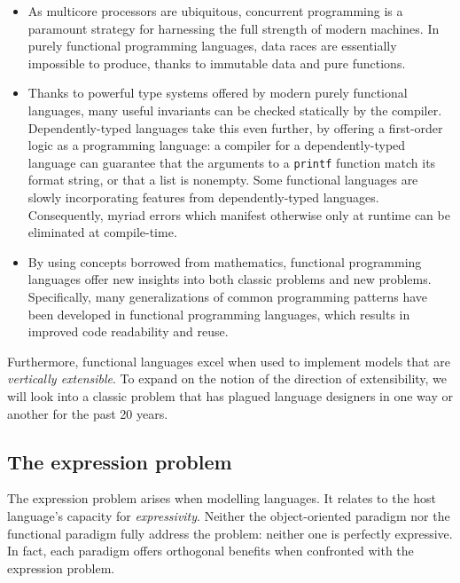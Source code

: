 \documentclass[letterpaper,11pt]{article}
\newcommand{\code}{\texttt}
\begin{document}
\begin{itemize}
    \item
        As multicore processors are ubiquitous, concurrent programming is a
        paramount strategy for harnessing the full strength of modern machines.
        In purely functional programming languages, data races are essentially
        impossible to produce, thanks to immutable data and pure functions.

    \item
        Thanks to powerful type systems offered by modern purely functional
        languages, many useful invariants can be checked statically by the
        compiler. Dependently-typed languages take this even further, by
        offering a first-order logic as a programming language: a compiler for
        a dependently-typed language can guarantee that the arguments to a
        \code{printf} function match its format string, or that a list is
        nonempty. Some functional languages are slowly incorporating features
        from dependently-typed languages. Consequently, myriad errors which
        manifest otherwise only at runtime can be eliminated at compile-time.

    \item
        By using concepts borrowed from mathematics, functional programming
        languages offer new insights into both classic problems and new
        problems.  Specifically, many generalizations of common programming
        patterns have been developed in functional programming languages, which
        results in improved code readability and reuse.
\end{itemize}

Furthermore, functional languages excel when used to implement models that are
\emph{vertically extensible}. To expand on the notion of the direction of
extensibility, we will look into a classic problem that has plagued language
designers in one way or another for the past 20 years.

\subsection{The expression problem}

The expression problem\cite{expression-problem} arises when modelling
languages. It relates to the host language's capacity for \emph{expressivity}.
Neither the object-oriented paradigm nor the functional paradigm fully address
the problem: neither one is perfectly expressive. In fact, each paradigm offers
orthogonal benefits when confronted with the expression problem.
\end{document}
